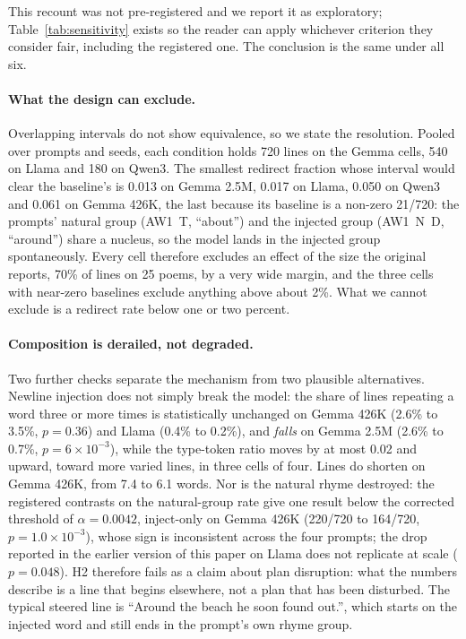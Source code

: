 \documentclass[11pt]{article}
\begin{document}
This recount was not pre-registered and we report it as exploratory; Table~\ref{tab:sensitivity} exists so the reader can apply whichever criterion they consider fair, including the registered one. The conclusion is the same under all six.

\paragraph{What the design can exclude.}
Overlapping intervals do not show equivalence, so we state the resolution. Pooled over prompts and seeds, each condition holds 720 lines on the Gemma cells, 540 on Llama and 180 on Qwen3. The smallest redirect fraction whose interval would clear the baseline's is 0.013 on Gemma 2.5M, 0.017 on Llama, 0.050 on Qwen3 and 0.061 on Gemma 426K, the last because its baseline is a non-zero 21/720: the prompts' natural group (AW1~T, ``about'') and the injected group (AW1~N~D, ``around'') share a nucleus, so the model lands in the injected group spontaneously. Every cell therefore excludes an effect of the size the original reports, 70\% of lines on 25 poems, by a very wide margin, and the three cells with near-zero baselines exclude anything above about 2\%. What we cannot exclude is a redirect rate below one or two percent.

\paragraph{Composition is derailed, not degraded.}
Two further checks separate the mechanism from two plausible alternatives. Newline injection does not simply break the model: the share of lines repeating a word three or more times is statistically unchanged on Gemma 426K (2.6\% to 3.5\%, $p=0.36$) and Llama (0.4\% to 0.2\%), and \emph{falls} on Gemma 2.5M (2.6\% to 0.7\%, $p=6\times10^{-3}$), while the type-token ratio moves by at most 0.02 and upward, toward more varied lines, in three cells of four. Lines do shorten on Gemma 426K, from 7.4 to 6.1 words. Nor is the natural rhyme destroyed: the registered contrasts on the natural-group rate give one result below the corrected threshold of $\alpha=0.0042$, inject-only on Gemma 426K (220/720 to 164/720, $p=1.0\times10^{-3}$), whose sign is inconsistent across the four prompts; the drop reported in the earlier version of this paper on Llama does not replicate at scale ($p=0.048$). H2 therefore fails as a claim about plan disruption: what the numbers describe is a line that begins elsewhere, not a plan that has been disturbed. The typical steered line is ``Around the beach he soon found out.'', which starts on the injected word and still ends in the prompt's own rhyme group.
\end{document}
